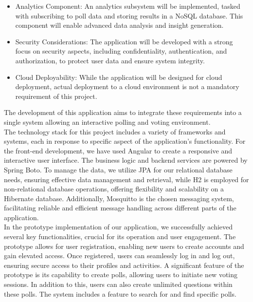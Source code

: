 \begin{itemize}
\item Analytics Component: An analytics subsystem will be implemented, tasked with subscribing to poll data and storing results in a NoSQL database. This component will enable advanced data analysis and insight generation.

\item Security Considerations: The application will be developed with a strong focus on security aspects, including confidentiality, authentication, and authorization, to protect user data and ensure system integrity.

\item Cloud Deployability: While the application will be designed for cloud deployment, actual deployment to a cloud environment is not a mandatory requirement of this project.
\end{itemize}

\noindent The development of this application aims to integrate these requirements into a single system allowing an interactive polling and voting environment.\\


\noindent The technology stack for this project includes a variety of frameworks and systems, each in response to specific aspect of the application's functionality. For the front-end development, we have used Angular to create a responsive and interactive user interface. The business logic and backend services are powered by Spring Boto. To manage the data, we utilize JPA for our relational database needs, ensuring effective data management and retrieval, while H2  is employed for non-relational database operations, offering flexibility and scalability on a Hibernate database. Additionally, Mosquitto is the chosen messaging system, facilitating reliable and efficient message handling across different parts of the application. \\

\noindent In the prototype implementation of our application, we successfully achieved several key functionalities, crucial for its operation and user engagement. The prototype allows for user registration, enabling new users to create accounts and gain elevated access. Once registered, users can seamlessly log in and log out, ensuring secure access to their profiles and activities. A significant feature of the prototype is its capability to create polls, allowing users to initiate new voting sessions. In addition to this, users can also create unlimited questions within these polls. The system includes a feature to search for and find specific polls. \\

